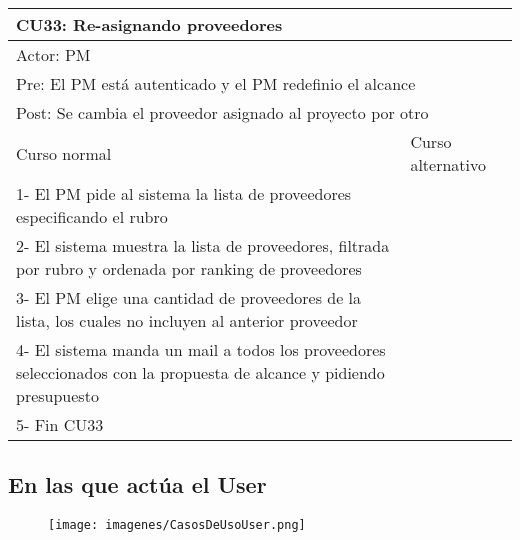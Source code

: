 \begin{table}[H]
  \begin{adjustbox}{max width = \textwidth}
  \begin{tabular}{|l|l|}
    \hline
    \multicolumn{2}{|l|}{CU33: Re-asignando proveedores} \\\hline
    \multicolumn{2}{|l|}{Actor: PM} \\\hline
    \multicolumn{2}{|l|}{Pre: El PM está autenticado y el PM redefinio el alcance} \\\hline
    \multicolumn{2}{|l|}{Post: Se cambia el proveedor asignado al proyecto por otro} \\\hline
     Curso normal & Curso alternativo\\ \hline
     1- El PM pide al sistema la lista de proveedores especificando el rubro & \\ \hline
     2- El sistema muestra la lista de proveedores, filtrada por rubro y ordenada por ranking de proveedores & \\ \hline
     3- El PM elige una cantidad de proveedores de la lista, los cuales no incluyen al anterior proveedor& \\ \hline
     4- El sistema manda un mail a todos los proveedores seleccionados con la propuesta de alcance y pidiendo presupuesto & \\ \hline
     5- Fin CU33 & \\ \hline
  \end{tabular}
  \end{adjustbox}
\end{table}

\subsection{En las que actúa el User}

\begin{figure}[H]
    \texttt{[image: imagenes/CasosDeUsoUser.png]}
\end{figure}

